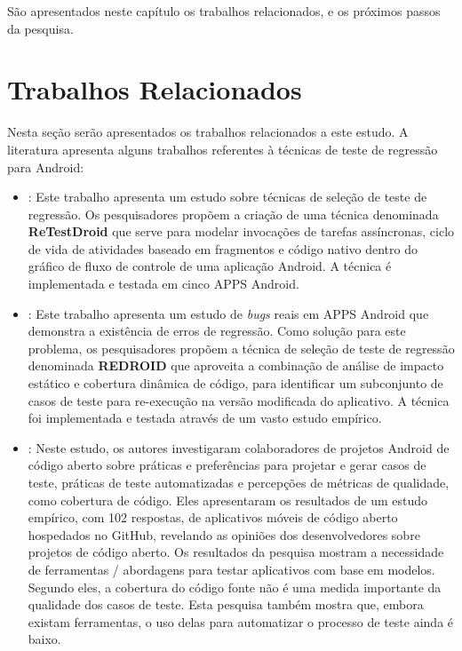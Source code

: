 \acresetall
São apresentados neste capítulo os trabalhos relacionados, e os próximos passos da pesquisa.%

\section{Trabalhos Relacionados}

Nesta seção serão apresentados os trabalhos relacionados a este estudo. A literatura apresenta alguns trabalhos referentes à técnicas de teste de regressão para Android:

\begin{itemize}
    
    \item \cite{8377661}: Este trabalho apresenta um estudo sobre técnicas de seleção de teste de regressão. Os pesquisadores propõem a criação de uma técnica denominada \textbf{ReTestDroid} que serve para modelar invocações de tarefas assíncronas, ciclo de vida de atividades baseado em fragmentos e código nativo dentro do gráfico de fluxo de controle de uma aplicação Android. A técnica é implementada e testada em cinco \ac{APPS} Android.
    
    \item \cite{Do2016RedroidAR}: Este trabalho apresenta um estudo de \textit{bugs} reais em \ac{APPS} Android que demonstra a existência de erros de regressão. Como solução para este problema, os pesquisadores propõem a técnica de seleção de teste de regressão denominada \textbf{REDROID} que aproveita a combinação de análise de impacto estático e cobertura dinâmica de código, para identificar um subconjunto de casos de teste para re-execução na versão modificada do aplicativo. A técnica foi implementada e testada através de um vasto estudo empírico.
    
    \item \cite{8094467}: Neste estudo, os autores investigaram colaboradores de projetos Android de código aberto sobre práticas e preferências para projetar e gerar casos de teste, práticas de teste automatizadas e percepções de métricas de qualidade, como cobertura de código. Eles apresentaram os resultados de um estudo empírico, com 102 respostas, de aplicativos móveis de código aberto hospedados no GitHub, revelando as opiniões dos desenvolvedores sobre projetos de código aberto. Os resultados da pesquisa mostram a necessidade de ferramentas / abordagens para testar aplicativos com base em modelos. Segundo eles, a cobertura do código fonte não é uma medida importante da qualidade dos casos de teste. Esta pesquisa também mostra que, embora existam ferramentas, o uso delas para automatizar o processo de teste ainda é baixo.
    

\end{itemize}
